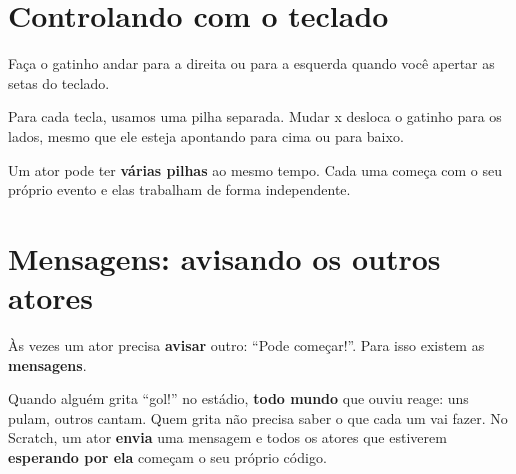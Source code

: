 \section{Controlando com o teclado}

\begin{missao}
Faça o gatinho andar para a direita ou para a esquerda quando você apertar as setas do teclado.
\end{missao}

Para cada tecla, usamos uma pilha separada. Mudar x desloca o gatinho para os lados, mesmo que ele esteja apontando para cima ou para baixo.

\begin{codigo}
\begin{pilha}
\end{pilha}
\end{codigo}

\begin{codigo}
\begin{pilha}
\end{pilha}
\end{codigo}

\begin{dica}
Um ator pode ter \textbf{várias pilhas} ao mesmo tempo. Cada uma começa com o seu próprio evento e elas trabalham de forma independente.
\end{dica}

\section{Mensagens: avisando os outros atores}

Às vezes um ator precisa \textbf{avisar} outro: ``Pode começar!''. Para isso existem as \textbf{mensagens}.

\begin{pensaassim}
Quando alguém grita ``gol!'' no estádio, \textbf{todo mundo} que ouviu reage: uns pulam, outros cantam. Quem grita não precisa saber o que cada um vai fazer. No Scratch, um ator \textbf{envia} uma mensagem e todos os atores que estiverem \textbf{esperando por ela} começam o seu próprio código.
\end{pensaassim}

